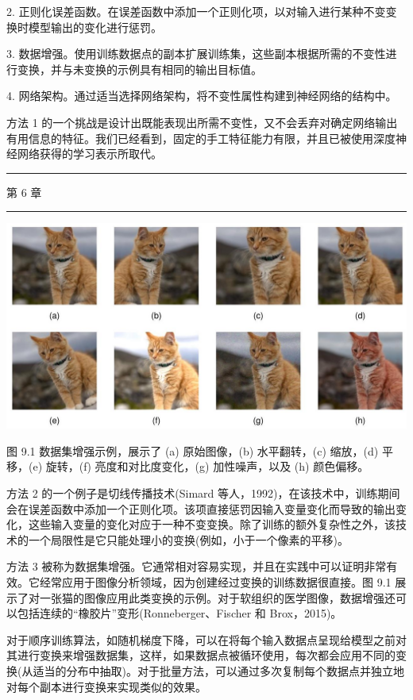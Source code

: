 \documentclass[10pt]{report}
\newcommand{\HRule}{\begin{center}\rule{0.9\linewidth}{0.2mm}\end{center}}
\begin{document}
2. 正则化误差函数。在误差函数中添加一个正则化项，以对输入进行某种不变变换时模型输出的变化进行惩罚。

3. 数据增强。使用训练数据点的副本扩展训练集，这些副本根据所需的不变性进行变换，并与未变换的示例具有相同的输出目标值。

4. 网络架构。通过适当选择网络架构，将不变性属性构建到神经网络的结构中。

方法 1 的一个挑战是设计出既能表现出所需不变性，又不会丢弃对确定网络输出有用信息的特征。我们已经看到，固定的手工特征能力有限，并且已被使用深度神经网络获得的学习表示所取代。

\HRule

第 6 章

\HRule

\begin{center}
\includegraphics[max width=1.0\textwidth]{images/0194e279-9b28-703a-88f4-c3ac21e2010d_277_227_355_1286_661_0.jpg}
\end{center}
\hspace*{3em} 

图 9.1 数据集增强示例，展示了 (a) 原始图像，(b) 水平翻转，(c) 缩放，(d) 平移，(e) 旋转，(f) 亮度和对比度变化，(g) 加性噪声，以及 (h) 颜色偏移。

方法 2 的一个例子是切线传播技术(Simard 等人，1992)，在该技术中，训练期间会在误差函数中添加一个正则化项。该项直接惩罚因输入变量变化而导致的输出变化，这些输入变量的变化对应于一种不变变换。除了训练的额外复杂性之外，该技术的一个局限性是它只能处理小的变换(例如，小于一个像素的平移)。

方法 3 被称为数据集增强。它通常相对容易实现，并且在实践中可以证明非常有效。它经常应用于图像分析领域，因为创建经过变换的训练数据很直接。图 9.1 展示了对一张猫的图像应用此类变换的示例。对于软组织的医学图像，数据增强还可以包括连续的“橡胶片”变形(Ronneberger、Fischer 和 Brox，2015)。

对于顺序训练算法，如随机梯度下降，可以在将每个输入数据点呈现给模型之前对其进行变换来增强数据集，这样，如果数据点被循环使用，每次都会应用不同的变换(从适当的分布中抽取)。对于批量方法，可以通过多次复制每个数据点并独立地对每个副本进行变换来实现类似的效果。
\end{document}
